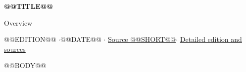 \documentclass[11pt,a4paper]{article}
\begin{document}
{\raggedright\LARGE\bfseries @@TITLE@@\par}
\smallskip
{\large Overview\par}
\smallskip
{\small @@EDITION@@ \enspace$\cdot$\enspace @@DATE@@ \enspace$\cdot$\enspace
\href{@@REPO@@/tree/@@SHA@@}{Source @@SHORT@@}\enspace$\cdot$\enspace
\href{@@EDITIONURL@@}{Detailed edition and sources}\par}
\medskip
@@BODY@@
\end{document}

